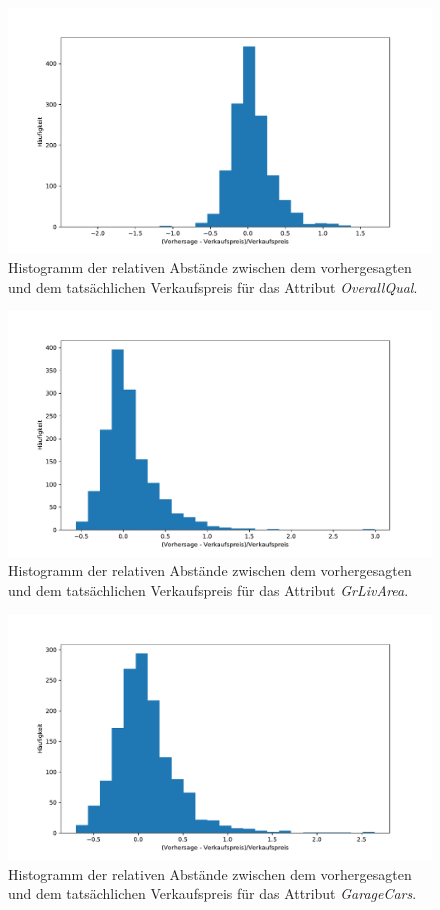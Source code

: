 \documentclass[a4paper, 11pt]{article}
\begin{document}
\begin{figure}
    \centering
    \includegraphics[width=\textwidth]{../A28abc/Hist_OverallQual.pdf}
    \caption{Histogramm der relativen Abstände zwischen dem vorhergesagten und dem tatsächlichen Verkaufspreis für das Attribut \textit{OverallQual}.}
    \label{fig:Hist_OverallQual}
\end{figure}
\begin{figure}
    \centering
    \includegraphics[width=\textwidth]{../A28abc/Hist_GrLivArea.pdf}
    \caption{Histogramm der relativen Abstände zwischen dem vorhergesagten und dem tatsächlichen Verkaufspreis für das Attribut \textit{GrLivArea}.}
    \label{fig:Hist_GrLivArea}
\end{figure}
\begin{figure}
    \centering
    \includegraphics[width=\textwidth]{../A28abc/Hist_GarageCars.pdf}
    \caption{Histogramm der relativen Abstände zwischen dem vorhergesagten und dem tatsächlichen Verkaufspreis für das Attribut \textit{GarageCars}.}
    \label{fig:Hist_GarageCars}
\end{figure}
\FloatBarrier
\end{document}
